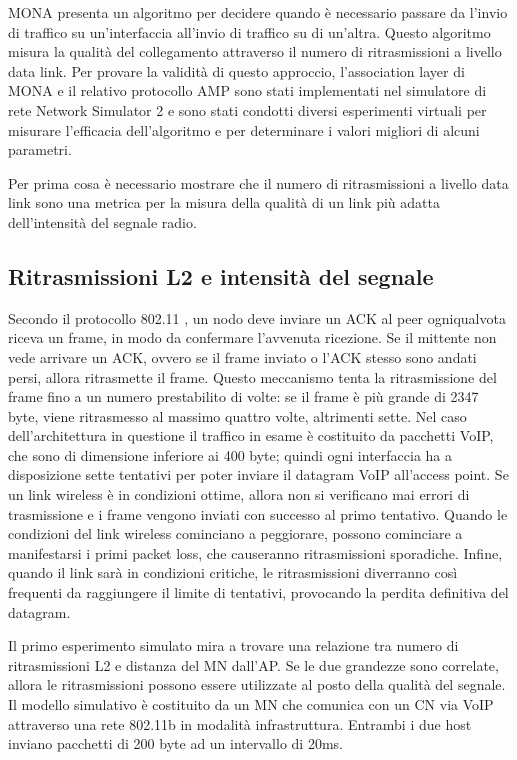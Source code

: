 \documentclass[12pt,a4paper,openright,twoside]{book}
\begin{document}
MONA presenta un algoritmo per decidere quando è necessario passare
da l'invio di traffico su un'interfaccia all'invio di traffico su di
un'altra. Questo algoritmo misura la qualità del collegamento
attraverso il numero di ritrasmissioni a livello data link. Per
provare la validità di questo approccio, l'association layer di MONA e
il relativo protocollo AMP sono stati implementati nel simulatore di
rete Network Simulator 2 e sono stati condotti diversi esperimenti
virtuali per misurare l'efficacia dell'algoritmo e per determinare i
valori migliori di alcuni parametri.

Per prima cosa è necessario mostrare che il numero di ritrasmissioni a
livello data link sono una metrica per la misura della qualità di un
link più adatta dell'intensità del segnale radio.

\subsection{Ritrasmissioni L2 e intensità del segnale}

Secondo il protocollo 802.11 \cite{bib:802.11}, un nodo deve inviare
un ACK al peer ogniqualvota riceva un frame, in modo da confermare
l'avvenuta ricezione. Se il mittente non vede arrivare un ACK, ovvero
se il frame inviato o l'ACK stesso sono andati persi, allora
ritrasmette il frame. Questo meccanismo tenta la ritrasmissione del
frame fino a un numero prestabilito di volte: se il frame è più grande
di 2347 byte, viene ritrasmesso al massimo quattro volte, altrimenti
sette. Nel caso dell'architettura in questione il traffico in esame è
costituito da pacchetti VoIP, che sono di dimensione inferiore ai 400
byte; quindi ogni interfaccia ha a disposizione sette tentativi per
poter inviare il datagram VoIP all'access point. Se un link wireless è
in condizioni ottime, allora non si verificano mai errori di
trasmissione e i frame vengono inviati con successo al primo
tentativo. Quando le condizioni del link wireless cominciano a
peggiorare, possono cominciare a manifestarsi i primi packet loss, che
causeranno ritrasmissioni sporadiche. Infine, quando il link sarà in
condizioni critiche, le ritrasmissioni diverranno così frequenti da
raggiungere il limite di tentativi, provocando la perdita definitiva
del datagram.

Il primo esperimento simulato mira a trovare una relazione tra numero
di ritrasmissioni L2 e distanza del MN dall'AP. Se le due grandezze
sono correlate, allora le ritrasmissioni possono essere utilizzate al
posto della qualità del segnale. Il modello simulativo è costituito da
un MN che comunica con un CN via VoIP attraverso una rete 802.11b in
modalità infrastruttura. Entrambi i due host inviano pacchetti di 200
byte ad un intervallo di 20ms.
\end{document}
